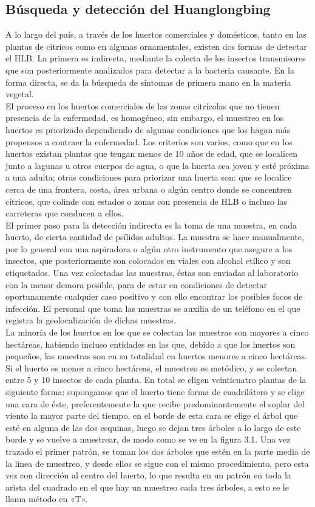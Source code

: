 \subsection{Búsqueda y detección del Huanglongbing}
A lo largo del país, a través de los huertos comerciales y domésticos, tanto en las plantas de cítricos como en algunas ornamentales, existen dos formas de detectar el HLB. La primera es indirecta, mediante la colecta de los insectos transmisores que son posteriormente analizados para detectar a la bacteria causante. En la forma directa, se da la búsqueda de síntomas de primera mano en la materia vegetal.\\ El proceso en los huertos comerciales de las zonas citrícolas que no tienen presencia de la enfermedad, es homogéneo, sin embargo, el muestreo en los huertos es priorizado dependiendo de algunas condiciones que los hagan más propensos a contraer la enfermedad. Los criterios son varios, como que en los huertos existan plantas que tengan menos de 10 años de edad, que se localicen junto a lagunas u otros cuerpos de agua, o que la huerta sea joven y esté próxima a una adulta; otras condiciones para priorizar una huerta son: que se localice cerca de una frontera, costa, área urbana o algún centro donde se concentren cítricos, que colinde con estados o zonas con presencia de HLB o incluso las carreteras que conducen a ellos.\\
El primer paso para la detección indirecta es la toma de una muestra, en cada huerto, de cierta cantidad de psílidos adultos. La muestra se hace manualmente, por lo general con una aspiradora o algún otro instrumento que asegure a los insectos, que posteriormente son colocados en viales con alcohol etílico y son etiquetados. Una vez colectadas las muestras, éstas son enviadas al laboratorio con la menor demora posible, para de estar en condiciones de detectar oportunamente cualquier caso positivo y con ello encontrar los posibles focos de infección. El personal que toma las muestras se auxilia de un teléfono en el que registra la geolocalización de dichas muestras.\\
La minoría de los huertos en los que se colectan las muestras son mayores a cinco hectáreas, habiendo incluso entidades en las que, debido a que los huertos son pequeños, las muestras son en su totalidad en huertos menores a cinco hectáreas. Si el huerto es menor a cinco hectáreas, el muestreo es metódico, y se colectan entre 5 y 10 insectos de cada planta. En total se eligen veinticuatro plantas de la siguiente forma: supongamos que el huerto tiene forma de cuadrilátero y se elige una cara de éste, preferentemente la que recibe predominantemente el soplar del viento la mayor parte del tiempo, en el borde de esta cara se elige el árbol que esté en alguna de las dos esquinas, luego se dejan tres árboles a lo largo de este borde y se vuelve a muestrear, de modo como se ve en la figura 3.1. Una vez trazado el primer patrón, se toman los dos árboles que estén en la parte media de la línea de muestreo, y desde ellos se sigue con el mismo procedimiento, pero esta vez con dirección al centro del huerto, lo que resulta en un patrón en toda la arista del cuadrado en el que hay un muestreo cada tres árboles, a esto se le llama método en «T».


